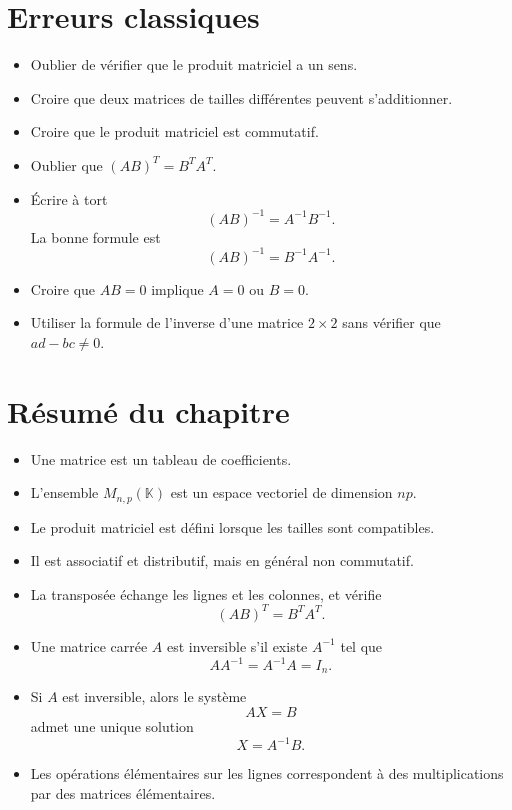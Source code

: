\documentclass[11pt,a4paper]{article}
\theoremstyle{remark}
\newcommand{\K}{\mathbb{K}}
\begin{document}
\section{Erreurs classiques}

\begin{itemize}
    \item Oublier de vérifier que le produit matriciel a un sens.
    \item Croire que deux matrices de tailles différentes peuvent s’additionner.
    \item Croire que le produit matriciel est commutatif.
    \item Oublier que \((AB)^T=B^TA^T\).
    \item Écrire à tort
    \[
    (AB)^{-1}=A^{-1}B^{-1}.
    \]
    La bonne formule est
    \[
    (AB)^{-1}=B^{-1}A^{-1}.
    \]
    \item Croire que \(AB=0\) implique \(A=0\) ou \(B=0\).
    \item Utiliser la formule de l’inverse d’une matrice \(2\times 2\) sans vérifier que \(ad-bc\neq 0\).
\end{itemize}

\section{Résumé du chapitre}

\begin{itemize}
    \item Une matrice est un tableau de coefficients.
    \item L’ensemble \(M_{n,p}(\K)\) est un espace vectoriel de dimension \(np\).
    \item Le produit matriciel est défini lorsque les tailles sont compatibles.
    \item Il est associatif et distributif, mais en général non commutatif.
    \item La transposée échange les lignes et les colonnes, et vérifie
    \[
    (AB)^T=B^TA^T.
    \]
    \item Une matrice carrée \(A\) est inversible s’il existe \(A^{-1}\) tel que
    \[
    AA^{-1}=A^{-1}A=I_n.
    \]
    \item Si \(A\) est inversible, alors le système
    \[
    AX=B
    \]
    admet une unique solution
    \[
    X=A^{-1}B.
    \]
    \item Les opérations élémentaires sur les lignes correspondent à des multiplications par des matrices élémentaires.
\end{itemize}
\end{document}
